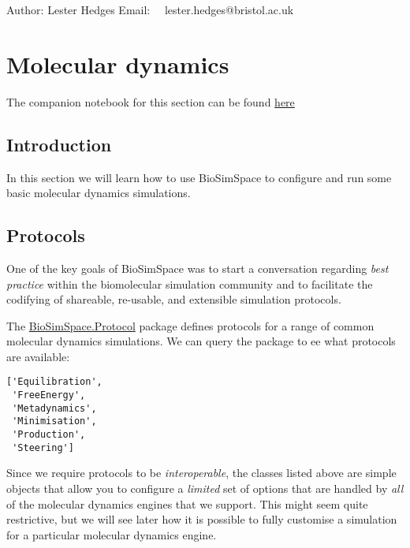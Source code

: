 Author: Lester Hedges Email:~~ lester.hedges@bristol.ac.uk

\hypertarget{molecular-dynamics}{%
\section{Molecular dynamics}\label{molecular-dynamics}}

The companion notebook for this section can be found
\href{https://github.com/michellab/BioSimSpaceTutorials/blob/4844562e7d2cd0b269cead56562ec16a3dfaef7c/01_introduction/03_molecular_dynamics.ipynb}{here}

\hypertarget{introduction}{%
\subsection{Introduction}\label{introduction}}

In this section we will learn how to use BioSimSpace to configure and
run some basic molecular dynamics simulations.

\hypertarget{protocols}{%
\subsection{Protocols}\label{protocols}}

One of the key goals of BioSimSpace was to start a conversation
regarding \emph{best practice} within the biomolecular simulation
community and to facilitate the codifying of shareable, re-usable, and
extensible simulation protocols.

The
\href{https://biosimspace.org/api/index_Protocol.html}{BioSimSpace.Protocol}
package defines protocols for a range of common molecular dynamics
simulations. We can query the package to ee what protocols are
available:

\begin{Shaded}
\begin{Highlighting}[]
\end{Highlighting}
\end{Shaded}

\begin{verbatim}
['Equilibration',
 'FreeEnergy',
 'Metadynamics',
 'Minimisation',
 'Production',
 'Steering']
\end{verbatim}

Since we require protocols to be \emph{interoperable}, the classes
listed above are simple objects that allow you to configure a
\emph{limited} set of options that are handled by \emph{all} of the
molecular dynamics engines that we support. This might seem quite
restrictive, but we will see later how it is possible to fully customise
a simulation for a particular molecular dynamics engine.

